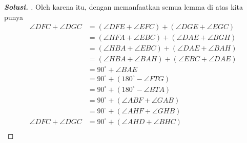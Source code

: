 \begin{proof}[\textbf{Solusi. }]
    Oleh karena itu, dengan memanfaatkan semua lemma di atas kita punya
    \begin{align*}
        \angle DFC + \angle DGC &= (\angle DFE + \angle EFC) + (\angle DGE + \angle EGC)\\
        &= (\angle HFA + \angle EBC) + (\angle DAE + \angle BGH)\\
        &= (\angle HBA + \angle EBC) + (\angle DAE + \angle BAH)\\
        &= (\angle HBA + \angle BAH) + (\angle EBC + \angle DAE)\\
        &= 90^\circ + \angle BAE\\
        &= 90^\circ + (180^\circ - \angle FTG)\\
        &= 90^\circ + (180^\circ - \angle BTA)\\
        &= 90^\circ + (\angle ABF + \angle GAB)\\
        &= 90^\circ + (\angle AHF + \angle GHB)\\ 
        \angle DFC + \angle DGC &= 90^\circ + (\angle AHD + \angle BHC)\\ 
    \end{align*}
\end{proof}

